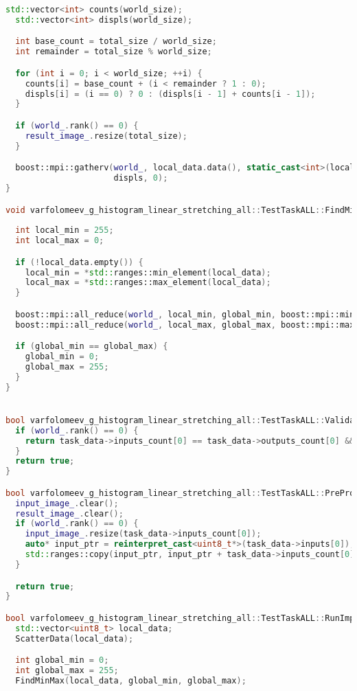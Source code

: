 \documentclass[a4paper,12pt]{article}
\begin{document}
\begin{lstlisting}[language=C++,
    breaklines=true,       % Автоматический перенос строк
    basicstyle=\small\ttfamily, % Уменьшенный шрифт
    columns=fullflexible ]
  std::vector<int> counts(world_size);
  std::vector<int> displs(world_size);

  int base_count = total_size / world_size;
  int remainder = total_size % world_size;

  for (int i = 0; i < world_size; ++i) {
    counts[i] = base_count + (i < remainder ? 1 : 0);
    displs[i] = (i == 0) ? 0 : (displs[i - 1] + counts[i - 1]);
  }

  if (world_.rank() == 0) {
    result_image_.resize(total_size);
  }

  boost::mpi::gatherv(world_, local_data.data(), static_cast<int>(local_data.size()), result_image_.data(), counts,
                      displs, 0);
}

void varfolomeev_g_histogram_linear_stretching_all::TestTaskALL::FindMinMax(const std::vector<uint8_t>& local_data,
                                                                            int& global_min, int& global_max) {
  int local_min = 255;
  int local_max = 0;

  if (!local_data.empty()) {
    local_min = *std::ranges::min_element(local_data);
    local_max = *std::ranges::max_element(local_data);
  }

  boost::mpi::all_reduce(world_, local_min, global_min, boost::mpi::minimum<int>());
  boost::mpi::all_reduce(world_, local_max, global_max, boost::mpi::maximum<int>());

  if (global_min == global_max) {
    global_min = 0;
    global_max = 255;
  }
}


bool varfolomeev_g_histogram_linear_stretching_all::TestTaskALL::ValidationImpl() {
  if (world_.rank() == 0) {
    return task_data->inputs_count[0] == task_data->outputs_count[0] && task_data->inputs_count[0] > 0;
  }
  return true;
}

bool varfolomeev_g_histogram_linear_stretching_all::TestTaskALL::PreProcessingImpl() {
  input_image_.clear();
  result_image_.clear();
  if (world_.rank() == 0) {
    input_image_.resize(task_data->inputs_count[0]);
    auto* input_ptr = reinterpret_cast<uint8_t*>(task_data->inputs[0]);
    std::ranges::copy(input_ptr, input_ptr + task_data->inputs_count[0], input_image_.begin());
  }

  return true;
}

bool varfolomeev_g_histogram_linear_stretching_all::TestTaskALL::RunImpl() {
  std::vector<uint8_t> local_data;
  ScatterData(local_data);

  int global_min = 0;
  int global_max = 255;
  FindMinMax(local_data, global_min, global_max);


\end{lstlisting}
\end{document}
